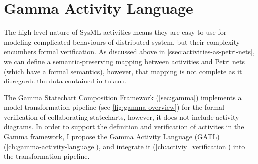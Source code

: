 \chapter{Gamma Activity Language}\label{ch:gamma-activity-language}

The high-level nature of SysML activities means they are easy to use for modeling complicated behaviours of distributed system, but their complexity encumbers formal verification. As discussed above in \autoref{ssec:activities-as-petri-nets}, we can define a semantic-preserving mapping between activities and Petri nets (which have a formal semantics), however, that mapping is not complete as it disregards the data contained in tokens.

The Gamma Statechart Composition Framework (\autoref{sec:gamma}) implements a model transformation pipeline (see \autoref{fig:gamma-overview}) for the formal verification of collaborating statecharts, however, it does not include activity diagrams. In order to support the definition and verification of activites in the Gamma framework, I propose the Gamma Activity Language (GATL) (\autoref{ch:gamma-activity-language}), and integrate it (\autoref{ch:activiy_verification}) into the transformation pipeline.





